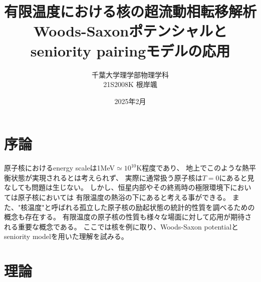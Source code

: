 \documentclass[a4paper]{jsarticle}
\title{有限温度における\ce{Sn}核の超流動相転移解析\\Woods-Saxonポテンシャルとseniority pairingモデルの応用}
\author{千葉大学理学部物理学科\\
21S2008K 根岸颯}
\date{2025年2月}
\begin{document}
\maketitle
\newpage

\tableofcontents
\newpage
\section{序論}
原子核におけるenergy scaleは1MeV$\simeq10^{10}$K程度であり、
地上でこのような熱平衡状態が実現されるとは考えられず、
実際に通常扱う原子核は$T=0$にあると見なしても問題は生じない。
しかし、恒星内部やその終焉時の極限環境下においては原子核においては
有限温度の熱浴の下にあると考える事ができる。
また、"核温度"と呼ばれる孤立した原子核の励起状態の統計的性質を調べるための概念も存在する。
有限温度の原子核の性質も様々な場面に対して応用が期待される重要な概念である。
ここでは核を例に取り、Woods-Saxon potentialとseniority modelを用いた理解を試みる。

\section{理論}
\end{document}
